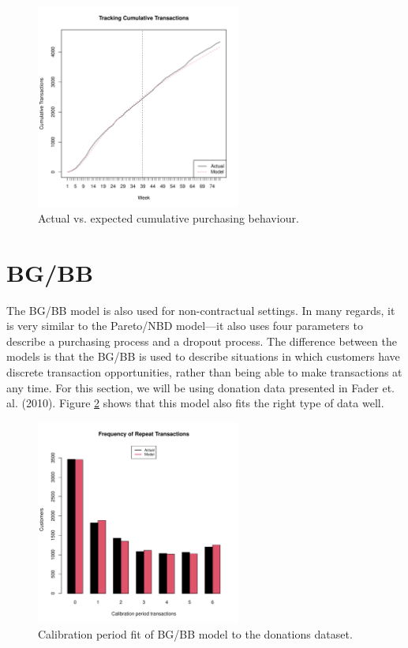 \documentclass[10pt, letterpaper, onecolumn, oneside, final]{article}\usepackage[]{graphicx}\usepackage[]{color}
\begin{document}
\begin{figure}
  \begin{center}
  \includegraphics[width=0.6\textwidth]{figure/bgnbdTrackingCum}
  \caption{Actual vs. expected cumulative purchasing behaviour.}\label{fig:bgnbdTrackingCum}
  \end{center}
\end{figure}







\section{BG/BB}

The BG/BB model is also used for non-contractual settings. In many
regards, it is very similar to the Pareto/NBD model---it also uses
four parameters to describe a purchasing process and a dropout
process. The difference between the models is that the BG/BB is used
to describe situations in which customers have discrete transaction
opportunities, rather than being able to make transactions at any
time. For this section, we will be using donation data presented in
Fader et. al. (2010). Figure \ref{fig:bgbbCalibrationFit} shows that
this model also fits the right type of data well.



\begin{figure}
  \begin{center}
  \includegraphics[width=0.6\textwidth]{figure/bgbbCalibrationFit}
  \caption{Calibration period fit of BG/BB model to the donations dataset.}\label{fig:bgbbCalibrationFit}
  \end{center}
\end{figure}
\end{document}
